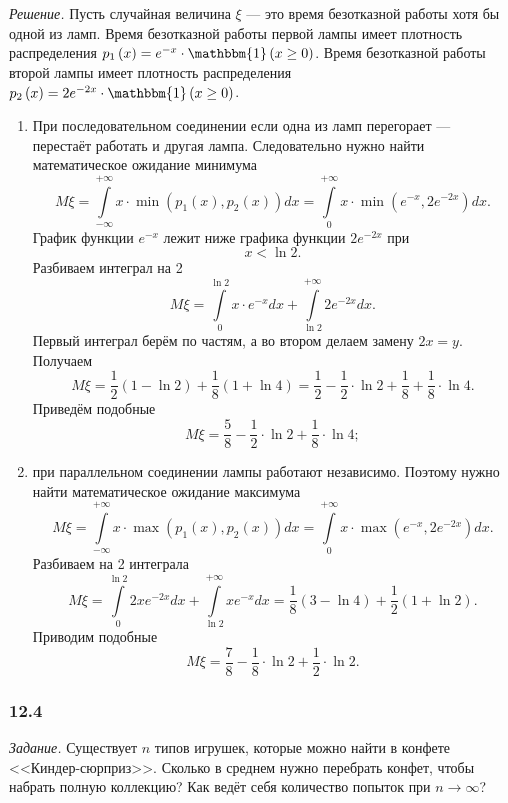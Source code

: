 \textit{Решение.} Пусть случайная величина $ \xi $ --- это время безотказной работы хотя бы одной из ламп.
Время безотказной работы первой лампы имеет плотность распределения $p_1 \left( x \right) = e^{-x} \cdot \mathbbm{1} \left( x \geq 0 \right) $.
Время безотказной работы второй лампы имеет плотность распределения $p_2 \left( x \right) = 2e^{-2x} \cdot \mathbbm{1} \left( x \geq 0 \right) $.

\begin{enumerate}[label=\alph*)]
\item При последовательном соединении если одна из ламп перегорает --- перестаёт работать и другая лампа.
Следовательно нужно найти математическое ожидание минимума
$$M \xi =
\int \limits_{- \infty }^{+ \infty } x \cdot \min \left( p_1 \left( x \right), p_2 \left( x \right) \right) dx =
\int \limits_0^{+ \infty } x \cdot \min \left( e^{-x}, 2e^{-2x} \right) dx.$$
График функции $e^{-x}$ лежит ниже графика функции $2e^{-2x}$ при
$$x < \ln 2.$$
Разбиваем интеграл на 2
$$M \xi =
\int \limits_0^{ \ln 2} x \cdot e^{-x} dx + \int \limits_{ \ln 2}^{+ \infty } 2e^{-2x} dx.$$
Первый интеграл берём по частям, а во втором делаем замену $2x = y$.
Получаем
$$M \xi =
\frac{1}{2} \left( 1 - \ln 2 \right) + \frac{1}{8} \left( 1 + \ln 4 \right) =
\frac{1}{2} - \frac{1}{2} \cdot \ln 2 + \frac{1}{8} + \frac{1}{8} \cdot \ln 4.$$
Приведём подобные
$$M \xi =
\frac{5}{8} - \frac{1}{2} \cdot \ln 2 + \frac{1}{8} \cdot \ln 4;$$
\item при параллельном соединении лампы работают независимо.
Поэтому нужно найти математическое ожидание максимума
$$M \xi =
\int \limits_{- \infty }^{+ \infty } x \cdot \max \left( p_1 \left( x \right), p_2 \left( x \right) \right) dx =
\int \limits_0^{+ \infty } x \cdot \max \left( e^{-x}, 2e^{-2x} \right) dx.$$
Разбиваем на 2 интеграла
$$M \xi =
\int \limits_0^{ \ln 2} 2xe^{-2x} dx + \int \limits_{ \ln 2}^{+ \infty } xe^{-x} dx =
\frac{1}{8} \left( 3 - \ln 4 \right) + \frac{1}{2} \left( 1 + \ln 2 \right).$$
Приводим подобные
$$M \xi =
\frac{7}{8} - \frac{1}{8} \cdot \ln 2 + \frac{1}{2} \cdot \ln 2.$$
\end{enumerate}

\subsubsection*{12.4}

\textit{Задание.} Существует $n$ типов игрушек, которые можно найти в конфете <<Киндер-сюрприз>>.
Сколько в среднем нужно перебрать конфет, чтобы набрать полную коллекцию?
Как ведёт себя количество попыток при $n \to \infty $?

